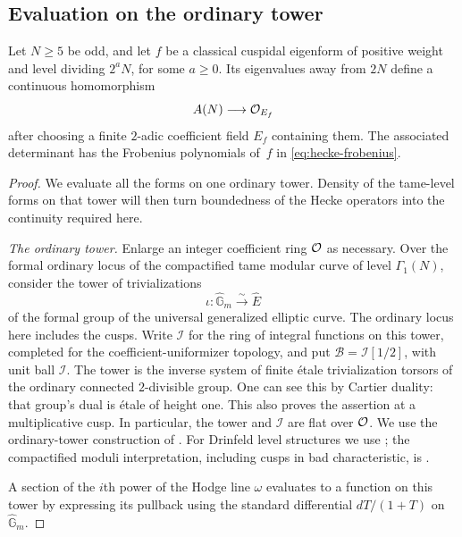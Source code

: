 \subsection{Evaluation on the ordinary tower}

\begin{proposition}\label{prop:hecke-level}
Let $N\geq5$ be odd, and let $f$ be a classical cuspidal eigenform
of positive weight and level dividing $2^aN$, for some $a\geq0$.
Its eigenvalues away from $2N$ define a continuous homomorphism
\[
 A(N)\longrightarrow\mathcal O_{E_f}
\]
after choosing a finite $2$-adic coefficient field $E_f$ containing
them.  The associated determinant has the Frobenius polynomials
of~$f$ in \eqref{eq:hecke-frobenius}.
\end{proposition}

\begin{proof}
We evaluate all the forms on one ordinary tower.  Density of the
tame-level forms on that tower will then turn boundedness of the
Hecke operators into the continuity required here.

\emph{The ordinary tower.}  Enlarge an
integer coefficient ring $\mathcal O$ as necessary.  Over the formal ordinary
locus of the compactified tame modular curve of level $\Gamma_1(N)$,
consider the tower of trivializations
\[
 \iota:\widehat{\mathbb G}_m\xrightarrow{\sim}\widehat E
\]
of the formal group of the universal generalized elliptic curve.
The ordinary locus here includes the cusps.  Write $\mathcal I$ for
the ring of integral functions on this tower, completed for the
coefficient-uniformizer topology, and put
$\mathcal B=\mathcal I[1/2]$, with unit ball $\mathcal I$.
The tower is the inverse system of finite \'etale trivialization
torsors of the ordinary connected $2$-divisible group.  One can see
this by Cartier duality: that group's dual is \'etale of height one.
This also proves the assertion at a multiplicative cusp.
In particular, the tower and $\mathcal I$ are flat over $\mathcal O$.
We use the ordinary-tower construction of
\cite[Section~4.2, Lemma~4.2.1 and Theorem~4.2.2]{Katz1973}.
For Drinfeld level structures we use
\cite[Section~3.2 and Lemma~3.5.1]{KatzMazur1985}; the compactified
moduli interpretation, including cusps in bad characteristic, is
\cite[Theorem~1.2.1 and Definition~2.4.1]{Conrad2007}.

A section of the $i$th power of the Hodge line $\omega$ evaluates
to a function on this tower by expressing its pullback using the
standard differential $dT/(1+T)$ on $\widehat{\mathbb G}_m$.


\end{proof}
